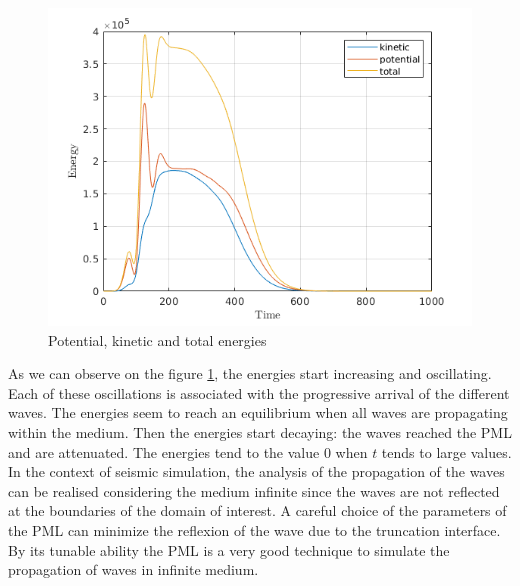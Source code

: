 \begin{figure}[H]
  \centering
  \includegraphics[scale=0.8]{images/Lamb_energy_imp.png}
  \caption{Potential, kinetic and total energies}
  \label{fig:Lamb_energy_imp}
\end{figure}  
As we can observe on the figure \ref{fig:Lamb_energy_imp}, the energies start increasing and oscillating. Each of these oscillations is associated with the progressive arrival of the different waves. The energies seem to reach an equilibrium when all waves are propagating within the medium. Then the energies start decaying: the waves reached the PML and are attenuated. The energies tend to the value $0$ when $t$ tends to large values. \\  
In the context of seismic simulation, the analysis of the propagation of the waves can be realised considering the medium infinite since the waves are not reflected at the boundaries of the domain of interest. A careful choice of the parameters of the PML can minimize the reflexion of the wave due to the truncation interface. By its tunable ability the PML is a very good technique to simulate the propagation of waves in infinite medium.\\

